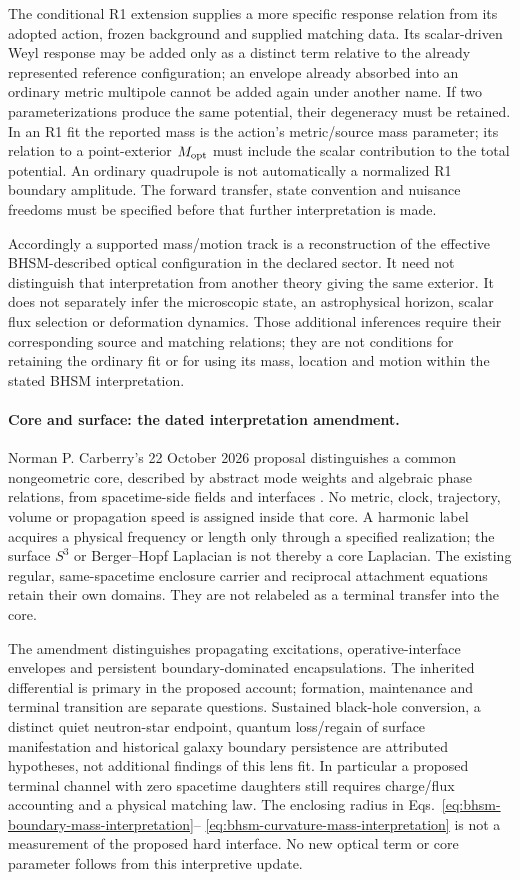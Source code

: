 The conditional R1 extension supplies a more specific response relation
from its adopted action, frozen background and supplied matching data.
Its scalar-driven Weyl response may be added only as a distinct term
relative to the already represented reference configuration; an envelope
already absorbed into an ordinary metric multipole cannot be added again
under another name. If two parameterizations produce the same potential,
their degeneracy must be retained. In an R1 fit the reported mass is the
action's metric/source mass parameter; its relation to a point-exterior
$M_{\rm opt}$ must include the scalar contribution to the total potential.
An ordinary quadrupole is not automatically a normalized R1 boundary
amplitude. The forward transfer, state convention and nuisance freedoms
must be specified before that further interpretation is made.

Accordingly a supported mass/motion track is a reconstruction of the
effective BHSM-described optical configuration in the declared sector.
It need not distinguish that interpretation from another theory giving
the same exterior. It does not separately infer the microscopic state,
an astrophysical horizon, scalar flux selection or deformation dynamics.
Those additional inferences require their corresponding source and
matching relations; they are not conditions for retaining the ordinary
fit or for using its mass, location and motion within the stated BHSM
interpretation.

\paragraph{Core and surface: the dated interpretation amendment.}
Norman P. Carberry's 22 October 2026 proposal distinguishes a common
nongeometric core, described by abstract mode weights and algebraic phase
relations, from spacetime-side fields and interfaces
\cite{CarberryCoreSurface2026}. No metric, clock, trajectory, volume or
propagation speed is assigned inside that core. A harmonic label acquires
a physical frequency or length only through a specified realization;
the surface $S^3$ or Berger--Hopf Laplacian is not thereby a core
Laplacian. The existing regular, same-spacetime enclosure carrier and
reciprocal attachment equations retain their own domains. They are not
relabeled as a terminal transfer into the core.

The amendment distinguishes propagating excitations, operative-interface
envelopes and persistent boundary-dominated encapsulations. The inherited
differential is primary in the proposed account; formation, maintenance
and terminal transition are separate questions. Sustained black-hole
conversion, a distinct quiet neutron-star endpoint, quantum loss/regain
of surface manifestation and historical galaxy boundary persistence are
attributed hypotheses, not additional findings of this lens fit. In
particular a proposed terminal channel with zero spacetime daughters
still requires charge/flux accounting and a physical matching law. The
enclosing radius in Eqs.~\eqref{eq:bhsm-boundary-mass-interpretation}--
\eqref{eq:bhsm-curvature-mass-interpretation} is not a measurement of the
proposed hard interface. No new optical term or core parameter follows
from this interpretive update.

